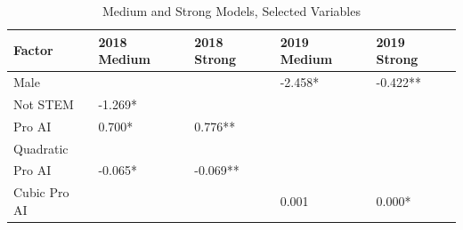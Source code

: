 \documentclass[AER]{./aea-latex-templates/AEA}
\begin{document}
        \begin{table}
            \caption{Medium and Strong Models, Selected Variables}
            \begin{tabular}{lllll}
            Factor & 2018 Medium & 2018 Strong & 2019 Medium & 2019 Strong \\
            \toprule
            Male &  &  & -2.458* & -0.422** \\
            Not STEM & -1.269* \\ %
            Pro AI & 0.700* & 0.776** \\ %
            Quadratic
            \\Pro AI & -0.065* & -0.069** \\ %
            Cubic Pro AI &  &  & 0.001 & 0.000* \\ %

\end{tabular}
\end{table}
\end{document}
